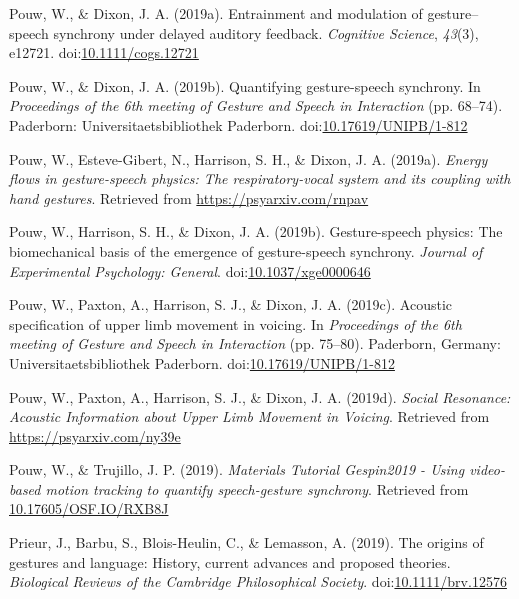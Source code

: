 \documentclass[
  man,floatsintext]{apa6}
\newlength{\cslhangindent}
\newenvironment{cslreferences}%
  {\setlength{\parindent}{0pt}%
  \everypar{\setlength{\hangindent}{\cslhangindent}}\ignorespaces}%
  {\par}
\begin{document}
\begin{cslreferences}
\leavevmode\hypertarget{ref-pouwEntrainmentModulationGesture2019}{}%
Pouw, W., \& Dixon, J. A. (2019a). Entrainment and modulation of gesture--speech synchrony under delayed auditory feedback. \emph{Cognitive Science}, \emph{43}(3), e12721. doi:\href{https://doi.org/10.1111/cogs.12721}{10.1111/cogs.12721}

\leavevmode\hypertarget{ref-pouwQuantifyingGesturespeechSynchrony2019}{}%
Pouw, W., \& Dixon, J. A. (2019b). Quantifying gesture-speech synchrony. In \emph{Proceedings of the 6th meeting of Gesture and Speech in Interaction} (pp. 68--74). Paderborn: Universitaetsbibliothek Paderborn. doi:\href{https://doi.org/10.17619/UNIPB/1-812}{10.17619/UNIPB/1-812}

\leavevmode\hypertarget{ref-pouwEnergyFlowsGesturespeech2019a}{}%
Pouw, W., Esteve-Gibert, N., Harrison, S. H., \& Dixon, J. A. (2019a). \emph{Energy flows in gesture-speech physics: The respiratory-vocal system and its coupling with hand gestures}. Retrieved from \url{https://psyarxiv.com/rnpav}

\leavevmode\hypertarget{ref-pouwGesturespeechPhysicsBiomechanical2019}{}%
Pouw, W., Harrison, S. H., \& Dixon, J. A. (2019b). Gesture-speech physics: The biomechanical basis of the emergence of gesture-speech synchrony. \emph{Journal of Experimental Psychology: General}. doi:\href{https://doi.org/10.1037/xge0000646}{10.1037/xge0000646}

\leavevmode\hypertarget{ref-pouwAcousticSpecificationUpper2019}{}%
Pouw, W., Paxton, A., Harrison, S. J., \& Dixon, J. A. (2019c). Acoustic specification of upper limb movement in voicing. In \emph{Proceedings of the 6th meeting of Gesture and Speech in Interaction} (pp. 75--80). Paderborn, Germany: Universitaetsbibliothek Paderborn. doi:\href{https://doi.org/10.17619/UNIPB/1-812}{10.17619/UNIPB/1-812}

\leavevmode\hypertarget{ref-pouwSocialResonanceAcoustic2019}{}%
Pouw, W., Paxton, A., Harrison, S. J., \& Dixon, J. A. (2019d). \emph{Social Resonance: Acoustic Information about Upper Limb Movement in Voicing}. Retrieved from \url{https://psyarxiv.com/ny39e}

\leavevmode\hypertarget{ref-pouwMaterialsTutorialGespin20192019}{}%
Pouw, W., \& Trujillo, J. P. (2019). \emph{Materials Tutorial Gespin2019 - Using video-based motion tracking to quantify speech-gesture synchrony}. Retrieved from \url{10.17605/OSF.IO/RXB8J}

\leavevmode\hypertarget{ref-prieurOriginsGesturesLanguage2019}{}%
Prieur, J., Barbu, S., Blois-Heulin, C., \& Lemasson, A. (2019). The origins of gestures and language: History, current advances and proposed theories. \emph{Biological Reviews of the Cambridge Philosophical Society}. doi:\href{https://doi.org/10.1111/brv.12576}{10.1111/brv.12576}


\end{cslreferences}
\end{document}
